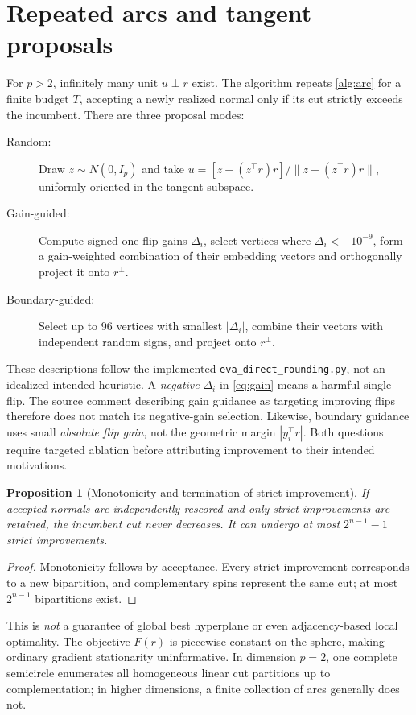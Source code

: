 \documentclass[10pt,letterpaper]{article}
\newtheorem{proposition}{Proposition}
\begin{document}
\section{Repeated arcs and tangent proposals}
For \(p>2\), infinitely many unit \(u\perp r\) exist. The algorithm repeats \cref{alg:arc} for a finite budget \(T\), accepting a newly realized normal only if its cut strictly exceeds the incumbent. There are three proposal modes:
\begin{description}
\item[Random:] Draw \(z\sim N(0,I_p)\) and take \(u=[z-(z^\top r)r]/\|z-(z^\top r)r\|\), uniformly oriented in the tangent subspace.
\item[Gain-guided:] Compute signed one-flip gains \(\Delta_i\), select vertices where \(\Delta_i<-10^{-9}\), form a gain-weighted combination of their embedding vectors and orthogonally project it onto \(r^\perp\).
\item[Boundary-guided:] Select up to 96 vertices with smallest \(|\Delta_i|\), combine their vectors with independent random signs, and project onto \(r^\perp\).
\end{description}
These descriptions follow the implemented \texttt{eva\_direct\_rounding.py}, not an idealized intended heuristic. A \emph{negative} \(\Delta_i\) in \eqref{eq:gain} means a harmful single flip. The source comment describing gain guidance as targeting improving flips therefore does not match its negative-gain selection. Likewise, boundary guidance uses small \emph{absolute flip gain}, not the geometric margin \(|y_i^\top r|\). Both questions require targeted ablation before attributing improvement to their intended motivations.

\begin{proposition}[Monotonicity and termination of strict improvement]
If accepted normals are independently rescored and only strict improvements are retained, the incumbent cut never decreases. It can undergo at most \(2^{n-1}-1\) strict improvements.
\end{proposition}
\begin{proof}
Monotonicity follows by acceptance. Every strict improvement corresponds to a new bipartition, and complementary spins represent the same cut; at most \(2^{n-1}\) bipartitions exist.
\end{proof}
This is \emph{not} a guarantee of global best hyperplane or even adjacency-based local optimality. The objective \(F(r)\) is piecewise constant on the sphere, making ordinary gradient stationarity uninformative. In dimension \(p=2\), one complete semicircle enumerates all homogeneous linear cut partitions up to complementation; in higher dimensions, a finite collection of arcs generally does not.
\end{document}
